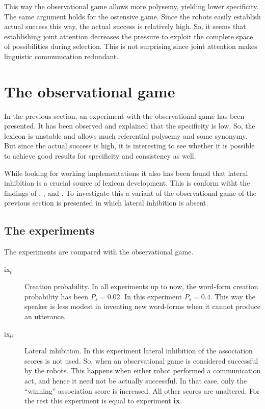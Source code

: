 This way the observational game allows more polysemy, yielding lower specificity. The same argument holds for the ostensive game. Since the robots easily establish actual success this way, the actual success is relatively high. So, it seems that establishing joint attention decreases the pressure to exploit the complete space of possibilities during selection. This is not surprising since joint attention makes linguistic communication redundant.


\section{The observational game}\label{s:par:observ}\label{s:feed:oli}

In the previous section, an experiment with the observational game has been presented. It has been observed and explained that the specificity is low. So, the lexicon is unstable and allows much referential polysemy and some synonymy. But since the actual success is high, it is interesting to see whether it is possible to achieve good results for specificity and consistency as well. 

While looking for working implementations it also has been found that lateral inhibition is a crucial source of lexicon development. This is conform witht the findings of \citet{oliphant:1997}, \citet{steels:2000}, \citet{dejong:2000} and \citet{kaplan:2000}. To investigate this a variant of the observational game of the previous section is presented in which lateral inhibition is absent.

\subsection{The experiments}

The experiments are compared with the observational game.

\begin{description}
\item[ix$_p$] Creation probability. In all experiments up to now, the word-form creation probability has been $P_s=0.02$. In this experiment $P_s=0.4$. This way the speaker is less modest in inventing new word-forms when it cannot produce an utterance. 
\item[ix$_{li}$] Lateral inhibition. In this experiment lateral inhibition of the association scores is not used. So, when an observational game is considered successful by the robots. This happens when either robot performed a communication act, and hence it need not be actually successful. In that case, only the ``winning'' association score is increased. All other scores are unaltered. For the rest this experiment is equal to experiment {\bf ix}. 
\end{description}

